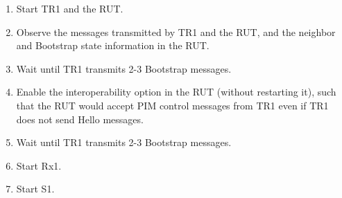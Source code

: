 \documentclass[11pt]{report}
\begin{document}

\begin{enumerate}

  \item Start TR1 and the RUT.

  \item Observe the messages transmitted by TR1 and the RUT, and the neighbor
  and Bootstrap state information in the RUT.

  \item Wait until TR1 transmits 2-3 Bootstrap messages.

  \item Enable the interoperability option in the RUT (without restarting it),
  such that the RUT would accept PIM control messages from TR1 even if TR1
  does not send Hello messages.

  \item Wait until TR1 transmits 2-3 Bootstrap messages.

  \item Start Rx1.

  \item Start S1.

\end{enumerate}

\end{document}
